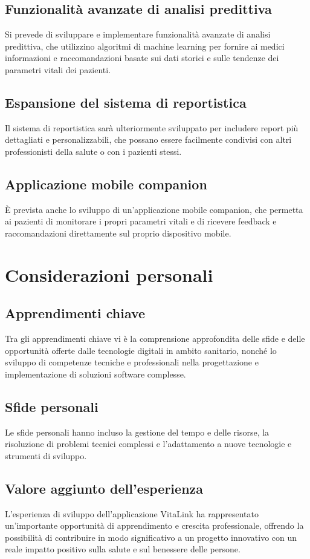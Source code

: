 \documentclass[12pt,a4paper,oneside]{report}
\begin{document}
\subsection{Funzionalità avanzate di analisi predittiva}
Si prevede di sviluppare e implementare funzionalità avanzate di analisi predittiva, che utilizzino algoritmi di machine learning per fornire ai medici informazioni e raccomandazioni basate sui dati storici e sulle tendenze dei parametri vitali dei pazienti.

\subsection{Espansione del sistema di reportistica}
Il sistema di reportistica sarà ulteriormente sviluppato per includere report più dettagliati e personalizzabili, che possano essere facilmente condivisi con altri professionisti della salute o con i pazienti stessi.

\subsection{Applicazione mobile companion}
È prevista anche lo sviluppo di un'applicazione mobile companion, che permetta ai pazienti di monitorare i propri parametri vitali e di ricevere feedback e raccomandazioni direttamente sul proprio dispositivo mobile.

\section{Considerazioni personali}
\subsection{Apprendimenti chiave}
Tra gli apprendimenti chiave vi è la comprensione approfondita delle sfide e delle opportunità offerte dalle tecnologie digitali in ambito sanitario, nonché lo sviluppo di competenze tecniche e professionali nella progettazione e implementazione di soluzioni software complesse.

\subsection{Sfide personali}
Le sfide personali hanno incluso la gestione del tempo e delle risorse, la risoluzione di problemi tecnici complessi e l'adattamento a nuove tecnologie e strumenti di sviluppo.

\subsection{Valore aggiunto dell'esperienza}
L'esperienza di sviluppo dell'applicazione VitaLink ha rappresentato un'importante opportunità di apprendimento e crescita professionale, offrendo la possibilità di contribuire in modo significativo a un progetto innovativo con un reale impatto positivo sulla salute e sul benessere delle persone.
\end{document}
